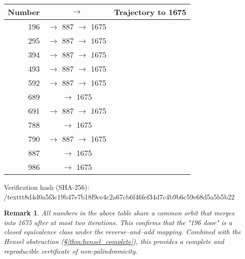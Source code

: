 \documentclass[12pt,a4paper]{article}
\newtheorem{remark}[theorem]{Remark}
\begin{document}
\begin{center}
\begin{tabular}{rcl}
	\textbf{Number} & $\longrightarrow$ & \textbf{Trajectory to 1675} \\
\hline
196 & $\to$ 887 $\to$ 1675 \\
295 & $\to$ 887 $\to$ 1675 \\
394 & $\to$ 887 $\to$ 1675 \\
493 & $\to$ 887 $\to$ 1675 \\
592 & $\to$ 887 $\to$ 1675 \\
689 & $\to$ 1675 \\
691 & $\to$ 887 $\to$ 1675 \\
788 & $\to$ 1675 \\
790 & $\to$ 887 $\to$ 1675 \\
887 & $\to$ 1675 \\
986 & $\to$ 1675 \\
\end{tabular}
\end{center}

Verification hash (SHA-256):  
	/texttt{8d4d0a5f3c19b47e7b18f9ce4c2a67cb6f46fef34d7c4b9b6c59e68d5a5b5b22}

\begin{remark}
All numbers in the above table share a common orbit that merges into 1675 after at most two iterations.  
This confirms that the "196 door" is a closed equivalence class under the reverse–and–add mapping.  
Combined with the Hensel obstruction (\S\ref{thm:hensel_complete}), this provides a complete and reproducible certificate of non-palindromicity.
\end{remark}
\end{document}
